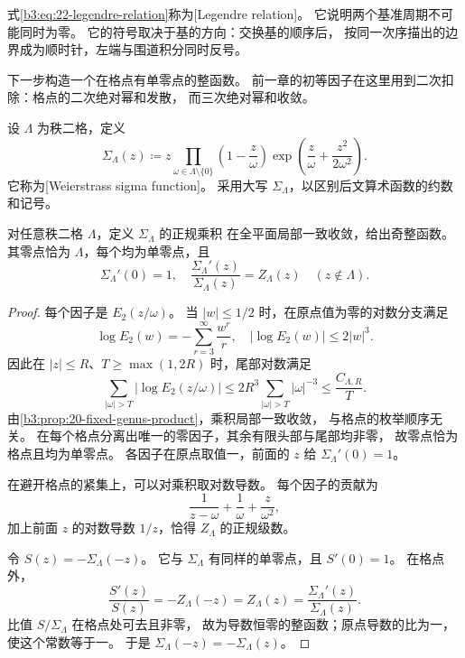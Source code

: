 式\eqref{b3:eq:22-legendre-relation}称为[Legendre relation]。
它说明两个基准周期不可能同时为零。
它的符号取决于基的方向：交换基的顺序后，
按同一次序描出的边界成为顺时针，左端与围道积分同时反号。

\ProseParagraphBreak
下一步构造一个在格点有单零点的整函数。
前一章的初等因子在这里用到二次扣除：格点的二次绝对幂和发散，
而三次绝对幂和收敛。

\begin{definition}\label{b3:def:22-sigma}
设 \(\Lambda\) 为秩二格，定义
\[
 \Sigma_\Lambda(z)\coloneqq z\prod_{\omega\in\Lambda\setminus\{0\}}
 \left(1-\frac z\omega\right)
 \exp\left(\frac z\omega+\frac{z^2}{2\omega^2}\right).
\]
它称为[Weierstrass sigma function]。
采用大写 \(\Sigma_\Lambda\)，以区别后文算术函数的约数和记号。
\end{definition}

\begin{proposition}[整乘积与对数导数]\label{b3:prop:22-sigma-product}
对任意秩二格 \(\Lambda\)，定义 \(\Sigma_\Lambda\) 的正规乘积
在全平面局部一致收敛，给出奇整函数。
其零点恰为 \(\Lambda\)，每个均为单零点，且
\[
 \Sigma_\Lambda'(0)=1,\quad
 \frac{\Sigma_\Lambda'(z)}{\Sigma_\Lambda(z)}=Z_\Lambda(z)
 \quad(z\notin\Lambda).
\]
\end{proposition}
\begin{proof}
每个因子是 \(E_2(z/\omega)\)。
当 \(|w|\le1/2\) 时，在原点值为零的对数分支满足
\[
 \log E_2(w)=-\sum_{r=3}^\infty\frac{w^r}{r},\quad
 |\log E_2(w)|\le2|w|^3.
\]
因此在 \(|z|\le R\)、\(T\ge\max(1,2R)\) 时，尾部对数满足
\[
 \sum_{|\omega|>T}|\log E_2(z/\omega)|
 \le2R^3\sum_{|\omega|>T}|\omega|^{-3}
 \le\frac{C_{\Lambda,R}}T.
\]
由\cref{b3:prop:20-fixed-genus-product}，乘积局部一致收敛，
与格点的枚举顺序无关。
在每个格点分离出唯一的零因子，其余有限头部与尾部均非零，
故零点恰为格点且均为单零点。
各因子在原点取值一，前面的 \(z\) 给 \(\Sigma_\Lambda'(0)=1\)。

在避开格点的紧集上，可以对乘积取对数导数。
每个因子的贡献为
\[
 \frac1{z-\omega}+\frac1\omega+\frac z{\omega^2},
\]
加上前面 \(z\) 的对数导数 \(1/z\)，恰得 \(Z_\Lambda\) 的正规级数。

令 \(S(z)=-\Sigma_\Lambda(-z)\)。
它与 \(\Sigma_\Lambda\) 有同样的单零点，且 \(S'(0)=1\)。
在格点外，
\[
 \frac{S'(z)}{S(z)}=-Z_\Lambda(-z)=Z_\Lambda(z)
 =\frac{\Sigma_\Lambda'(z)}{\Sigma_\Lambda(z)}.
\]
比值 \(S/\Sigma_\Lambda\) 在格点处可去且非零，
故为导数恒零的整函数；原点导数的比为一，使这个常数等于一。
于是 \(\Sigma_\Lambda(-z)=-\Sigma_\Lambda(z)\)。
\end{proof}

